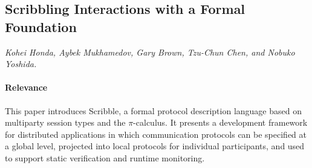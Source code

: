 \documentclass{article}
\begin{document}
\subsection{Scribbling Interactions with a Formal Foundation}
\textit{Kohei Honda, Aybek Mukhamedov, Gary Brown, Tzu-Chun Chen, and Nobuko Yoshida.}~\cite{honda-et-al-2011}

\paragraph{Relevance}
This paper introduces Scribble, a formal protocol description language based on multiparty session types and the $\pi$-calculus. It presents a development framework for distributed applications in which communication protocols can be specified at a global level, projected into local protocols for individual participants, and used to support static verification and runtime monitoring.
\end{document}
